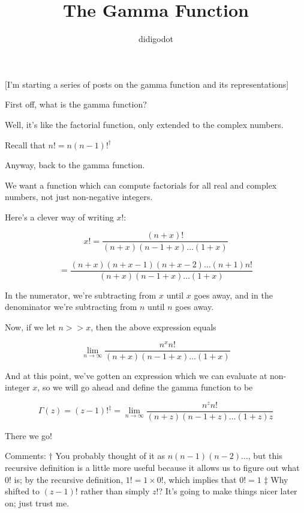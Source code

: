 \documentclass[11pt]{article} %
\title{The Gamma Function}
\author{didigodot}
\begin{document}
\maketitle

[I'm starting a series of posts on the gamma function and its representations]

First off, what is the gamma function?

Well, it's like the factorial function, only extended to the complex numbers.

Recall that $n!=n(n-1)!^{\dagger}$

Anyway, back to the gamma function. 

We want a function which can compute factorials for all real and complex numbers, not just non-negative integers.

Here's a clever way of writing $x!$:

$$x!=\frac{(n+x)!}{(n+x)(n-1+x)\dots(1+x)}$$

$$=\frac{(n+x)(n+x-1)(n+x-2)\dots(n+1)n!}{(n+x)(n-1+x)\dots(1+x)}$$

In the numerator, we're subtracting from $x$ until $x$ goes away, and in the denominator we're subtracting from $n$ until $n$ goes away.

Now, if we let $n>>x$, then the above expression equals

$$\lim_{n\to\infty}\frac{n^xn!}{(n+x)(n-1+x)\dots(1+x)}$$

And at this point, we've gotten an expression which we can evaluate at non-integer $x$, so we will go ahead and define the gamma function to be

$$\Gamma(z)=(z-1)!^{\ddagger}=\lim_{n\to\infty}\frac{n^{z}n!}{(n+z)(n-1+z)\dots(1+z)z}$$

There we go!

Comments:
$\dagger$ You probably thought of it as $n(n-1)(n-2)\dots$, but this recursive definition is a little more useful because it allows us to figure out what $0!$ is; by the recursive definition, $1!=1\times0!$, which implies that $0!=1$
$\ddagger$ Why shifted to $(z-1)!$ rather than simply $z!$? It's going to make things nicer later on; just trust me.
\end{document}
